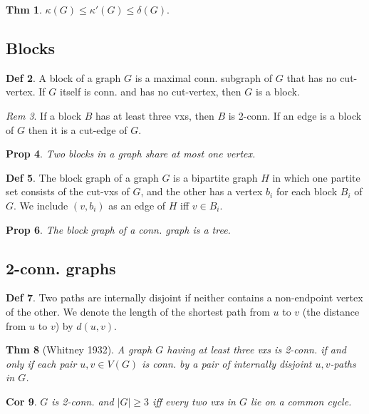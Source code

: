 \documentclass[11pt, fleqn, a4paper, landscape]{article}
\theoremstyle{plain} %
\newtheorem{thm}{Thm}
\newtheorem{pro}[thm]{Prop}
\newtheorem{cor}[thm]{Cor}
\theoremstyle{remark} %
\newtheorem{rem}[thm]{Rem}
\theoremstyle{definition} %
\newtheorem{defi}[thm]{Def}
\begin{document}
\begin{multicols}{5}
\begin{thm}
$\kappa (G) \le \kappa'(G) \le \delta(G).$
\end{thm}

\subsection{Blocks}
\begin{defi}
A block of a graph $G$ is a maximal conn. subgraph of $G$ that has no cut-vertex.
If $G$ itself is conn. and has no cut-vertex, then $G$ is a block.
\end{defi}
\addtocounter{thm}{1}
\begin{rem}
If a block $B$ has at least three vxs, then $B$ is 2-conn. If an edge is a block of $G$ then it is a cut-edge of $G$.
\end{rem}

\begin{pro}
Two blocks in a graph share at most one vertex.
\end{pro}

\begin{defi}
The block graph of a graph $G$ is a bipartite graph $H$ in which one partite set consists of the cut-vxs of $G$, and the other has a vertex $b_i$ for each block $B_i$ of $G$. We include $(v, b_i)$ as an edge of $H$ iff $v \in B_i.$
\end{defi}
\addtocounter{thm}{1}
\begin{pro}
The block graph of a conn. graph is a tree.
\end{pro}

\subsection{2-conn. graphs}

\begin{defi}
Two paths are internally disjoint if neither contains a non-endpoint vertex of the other. We denote the length of the shortest path from $u$ to $v$ (the distance from $u$ to $v$) by $d(u, v)$.
\end{defi}

\begin{thm}[Whitney 1932]
A graph $G$ having at least three vxs is 2-conn. if and only
if each pair $u, v \in V (G)$ is conn. by a pair of internally disjoint $u, v$-paths in $G$.
\end{thm}

\begin{cor}
$G$ is 2-conn. and $|G|\ge 3$ iff every two vxs in $G$ lie on a common cycle.
\end{cor}

\end{multicols}
\end{document}
